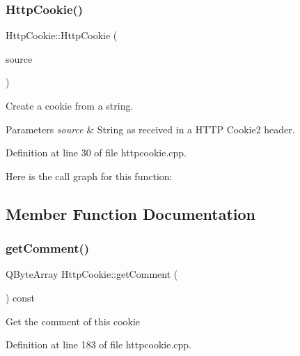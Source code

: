 \mbox{\label{classstefanfrings_1_1_http_cookie_a07a3638faff8669808c9eb3267bc4d7c}} 
\subsubsection{\texorpdfstring{Http\+Cookie()}{HttpCookie()}\hspace{0.1cm}{\footnotesize\ttfamily [3/3]}}
{\footnotesize\ttfamily Http\+Cookie\+::\+Http\+Cookie (\begin{DoxyParamCaption}\item[{const Q\+Byte\+Array}]{source }\end{DoxyParamCaption})}

Create a cookie from a string. 
\begin{DoxyParams}{Parameters}
{\em source} & String as received in a H\+T\+TP Cookie2 header. \\
\hline
\end{DoxyParams}


Definition at line 30 of file httpcookie.\+cpp.

Here is the call graph for this function\+:


\subsection{Member Function Documentation}
\mbox{\label{classstefanfrings_1_1_http_cookie_ad48e447c1d4dfbed9e81713016ca0531}} 
\subsubsection{\texorpdfstring{get\+Comment()}{getComment()}}
{\footnotesize\ttfamily Q\+Byte\+Array Http\+Cookie\+::get\+Comment (\begin{DoxyParamCaption}{ }\end{DoxyParamCaption}) const}

Get the comment of this cookie 

Definition at line 183 of file httpcookie.\+cpp.

